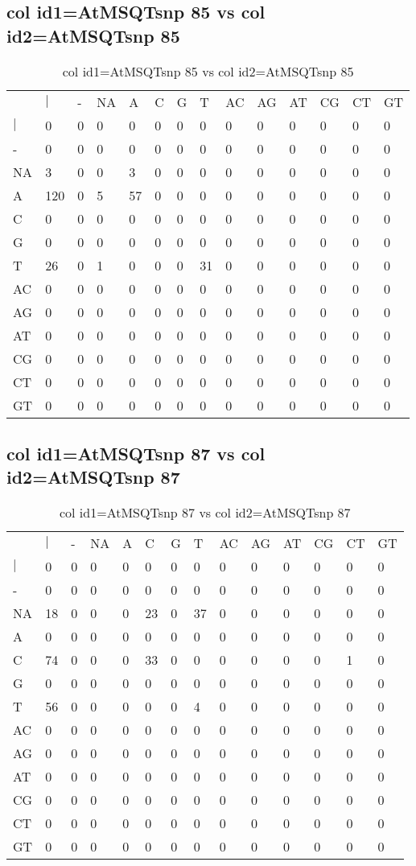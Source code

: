 \subsection{col id1=AtMSQTsnp 85 vs col id2=AtMSQTsnp 85}
\begin{center}
\begin{longtable}{|l|l|l|l|l|l|l|l|l|l|l|l|l|l|}
\caption{col id1=AtMSQTsnp 85 vs col id2=AtMSQTsnp 85} \label{table_dm776}\\
\hline
\\
\hline
&$|$&-&NA&A&C&G&T&AC&AG&AT&CG&CT&GT\\
$|$&0&0&0&0&0&0&0&0&0&0&0&0&0\\
-&0&0&0&0&0&0&0&0&0&0&0&0&0\\
NA&3&0&0&3&0&0&0&0&0&0&0&0&0\\
A&120&0&5&57&0&0&0&0&0&0&0&0&0\\
C&0&0&0&0&0&0&0&0&0&0&0&0&0\\
G&0&0&0&0&0&0&0&0&0&0&0&0&0\\
T&26&0&1&0&0&0&31&0&0&0&0&0&0\\
AC&0&0&0&0&0&0&0&0&0&0&0&0&0\\
AG&0&0&0&0&0&0&0&0&0&0&0&0&0\\
AT&0&0&0&0&0&0&0&0&0&0&0&0&0\\
CG&0&0&0&0&0&0&0&0&0&0&0&0&0\\
CT&0&0&0&0&0&0&0&0&0&0&0&0&0\\
GT&0&0&0&0&0&0&0&0&0&0&0&0&0\\
\hline
\end{longtable}
\end{center}

\subsection{col id1=AtMSQTsnp 87 vs col id2=AtMSQTsnp 87}
\begin{center}
\begin{longtable}{|l|l|l|l|l|l|l|l|l|l|l|l|l|l|}
\caption{col id1=AtMSQTsnp 87 vs col id2=AtMSQTsnp 87} \label{table_dm778}\\
\hline
\\
\hline
&$|$&-&NA&A&C&G&T&AC&AG&AT&CG&CT&GT\\
$|$&0&0&0&0&0&0&0&0&0&0&0&0&0\\
-&0&0&0&0&0&0&0&0&0&0&0&0&0\\
NA&18&0&0&0&23&0&37&0&0&0&0&0&0\\
A&0&0&0&0&0&0&0&0&0&0&0&0&0\\
C&74&0&0&0&33&0&0&0&0&0&0&1&0\\
G&0&0&0&0&0&0&0&0&0&0&0&0&0\\
T&56&0&0&0&0&0&4&0&0&0&0&0&0\\
AC&0&0&0&0&0&0&0&0&0&0&0&0&0\\
AG&0&0&0&0&0&0&0&0&0&0&0&0&0\\
AT&0&0&0&0&0&0&0&0&0&0&0&0&0\\
CG&0&0&0&0&0&0&0&0&0&0&0&0&0\\
CT&0&0&0&0&0&0&0&0&0&0&0&0&0\\
GT&0&0&0&0&0&0&0&0&0&0&0&0&0\\
\hline
\end{longtable}
\end{center}

